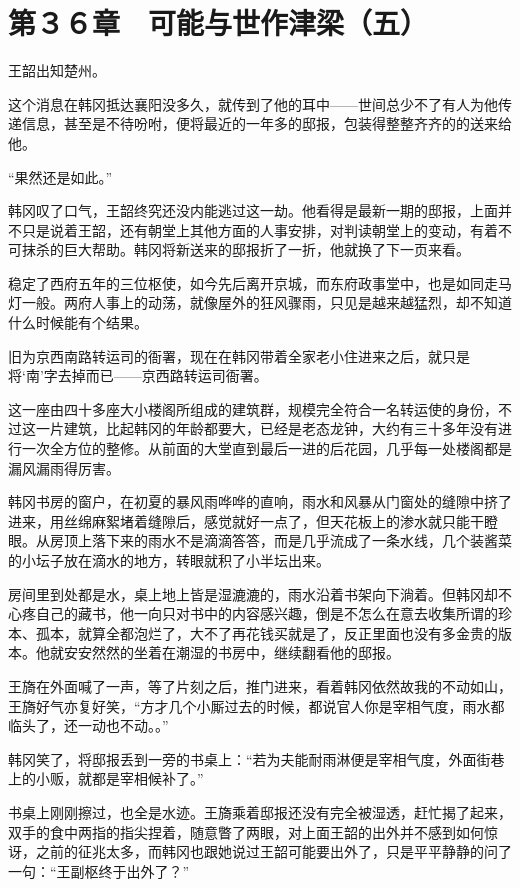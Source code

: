 \section{第３６章　可能与世作津梁（五）}

王韶出知楚州。

这个消息在韩冈抵达襄阳没多久，就传到了他的耳中——世间总少不了有人为他传递信息，甚至是不待吩咐，便将最近的一年多的邸报，包装得整整齐齐的的送来给他。

“果然还是如此。”

韩冈叹了口气，王韶终究还没内能逃过这一劫。他看得是最新一期的邸报，上面并不只是说着王韶，还有朝堂上其他方面的人事安排，对判读朝堂上的变动，有着不可抹杀的巨大帮助。韩冈将新送来的邸报折了一折，他就换了下一页来看。

稳定了西府五年的三位枢使，如今先后离开京城，而东府政事堂中，也是如同走马灯一般。两府人事上的动荡，就像屋外的狂风骤雨，只见是越来越猛烈，却不知道什么时候能有个结果。

旧为京西南路转运司的衙署，现在在韩冈带着全家老小住进来之后，就只是将‘南’字去掉而已——京西路转运司衙署。

这一座由四十多座大小楼阁所组成的建筑群，规模完全符合一名转运使的身份，不过这一片建筑，比起韩冈的年龄都要大，已经是老态龙钟，大约有三十多年没有进行一次全方位的整修。从前面的大堂直到最后一进的后花园，几乎每一处楼阁都是漏风漏雨得厉害。

韩冈书房的窗户，在初夏的暴风雨哗哗的直响，雨水和风暴从门窗处的缝隙中挤了进来，用丝绵麻絮堵着缝隙后，感觉就好一点了，但天花板上的渗水就只能干瞪眼。从房顶上落下来的雨水不是滴滴答答，而是几乎流成了一条水线，几个装酱菜的小坛子放在滴水的地方，转眼就积了小半坛出来。

房间里到处都是水，桌上地上皆是湿漉漉的，雨水沿着书架向下淌着。但韩冈却不心疼自己的藏书，他一向只对书中的内容感兴趣，倒是不怎么在意去收集所谓的珍本、孤本，就算全都泡烂了，大不了再花钱买就是了，反正里面也没有多金贵的版本。他就安安然然的坐着在潮湿的书房中，继续翻看他的邸报。

王旖在外面喊了一声，等了片刻之后，推门进来，看着韩冈依然故我的不动如山，王旖好气亦复好笑，“方才几个小厮过去的时候，都说官人你是宰相气度，雨水都临头了，还一动也不动。。”

韩冈笑了，将邸报丢到一旁的书桌上：“若为夫能耐雨淋便是宰相气度，外面街巷上的小贩，就都是宰相候补了。”

书桌上刚刚擦过，也全是水迹。王旖乘着邸报还没有完全被湿透，赶忙揭了起来，双手的食中两指的指尖捏着，随意瞥了两眼，对上面王韶的出外并不感到如何惊讶，之前的征兆太多，而韩冈也跟她说过王韶可能要出外了，只是平平静静的问了一句：“王副枢终于出外了？”

